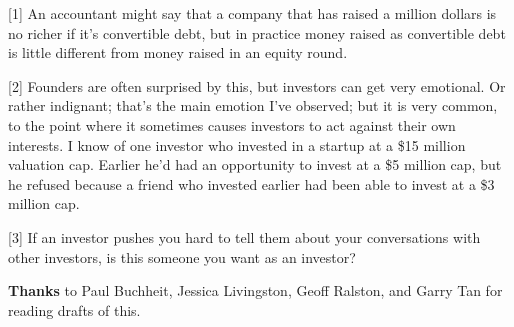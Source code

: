[1] An accountant might say that a company that has raised a
                    million dollars is no richer if it's convertible debt, but
                    in practice money raised as convertible debt is little
                    different from money raised in an equity round.

[2] Founders are often surprised by this, but investors can
                    get very emotional. Or rather indignant; that's the main
                    emotion I've observed; but it is very common, to the point
                    where it sometimes causes investors to act against their own
                    interests. I know of one investor who invested in a startup
                    at a \$15 million valuation cap. Earlier he'd had an
                    opportunity to invest at a \$5 million cap, but he refused
                    because a friend who invested earlier had been able to
                    invest at a \$3 million cap.

[3] If an investor pushes you hard to tell them about your
                    conversations with other investors, is this someone you want
                    as an investor?


                    \textbf{Thanks} to Paul Buchheit, Jessica Livingston, Geoff
                    Ralston, and Garry Tan for reading drafts of this.



              
            
          
